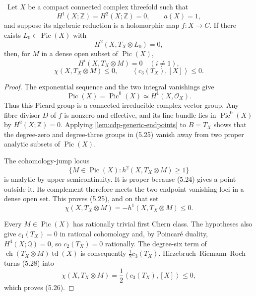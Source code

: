 \begin{theorem}
\label{thm:corrected-cdp-global}
\Verified\ Let \(X\) be a compact connected complex threefold such that
\[
 H^1(X;\mathbb Z)=H^2(X;\mathbb Z)=0,\qquad a(X)=1,
\]
and suppose its algebraic reduction is a holomorphic map
\(f:X\to C\).  If there exists \(L_0\in\operatorname{Pic}(X)\) with
\[
 H^2(X,T_X\otimes L_0)=0,
\tag{5.24}
\]
then, for \(M\) in a dense open subset of \(\operatorname{Pic}(X)\),
\[
 H^i(X,T_X\otimes M)=0\quad(i\ne1),
\tag{5.25}
\]
\[
 \chi(X,T_X\otimes M)\le0,\qquad
 \left\langle c_3(T_X),[X]\right\rangle\le0.
\tag{5.26}
\]
\end{theorem}

\begin{proof}
The exponential sequence and the two integral vanishings give
\[
 \operatorname{Pic}(X)=\operatorname{Pic}^0(X)
 \simeq H^1(X,\mathcal O_X).
\tag{5.27}
\]
Thus this Picard group is a connected irreducible complex vector group.  Any fibre divisor \(D\) of
\(f\) is nonzero and effective, and its line bundle lies in
\(\operatorname{Pic}^0(X)\) by \(H^2(X;\mathbb Z)=0\).  Applying
\cref{lem:cdp-generic-endpoints} to \(B=T_X\) shows that the degree-zero and
degree-three groups in (5.25) vanish away from two proper analytic subsets
of \(\operatorname{Pic}(X)\).

The cohomology-jump locus
\[
 \{M\in\operatorname{Pic}(X):h^2(X,T_X\otimes M)\ge1\}
\]
is analytic by upper semicontinuity.  It is proper because (5.24) gives a
point outside it.  Its complement therefore meets the two endpoint
vanishing loci in a dense open set.  This proves (5.25), and on that set
\[
 \chi(X,T_X\otimes M)=-h^1(X,T_X\otimes M)\le0.
\tag{5.28}
\]

Every \(M\in\operatorname{Pic}(X)\) has rationally trivial first Chern
class.  The hypotheses also give \(c_1(T_X)=0\) in rational cohomology and,
by Poincar\'e duality, \(H^4(X;\mathbb Q)=0\), so
\(c_2(T_X)=0\) rationally.  The degree-six term of
\(\operatorname{ch}(T_X\otimes M)\operatorname{td}(X)\) is consequently
\(\tfrac12c_3(T_X)\).  Hirzebruch--Riemann--Roch turns (5.28) into
\[
 \chi(X,T_X\otimes M)
 =\frac12\left\langle c_3(T_X),[X]\right\rangle\le0,
\]
which proves (5.26).
\end{proof}

